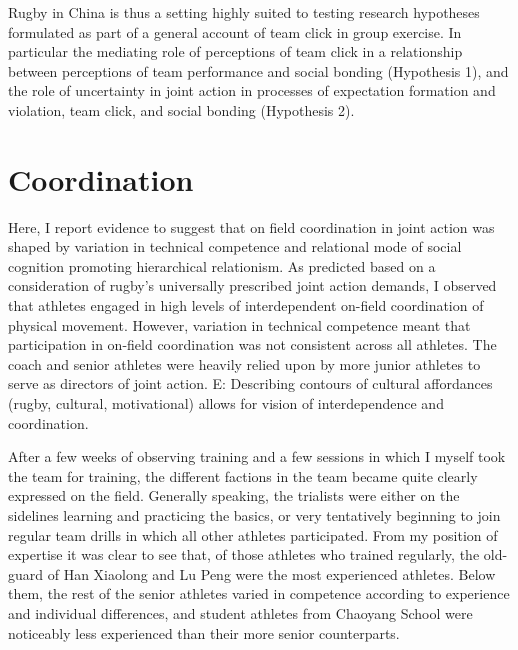 \begin{CJK}{UTF8}{gbsn}
Rugby in China is thus a setting highly suited to testing research hypotheses formulated as part of a general account of team click in group exercise. In particular the mediating role of perceptions of team click in a relationship between perceptions of team performance and social bonding (Hypothesis 1), and the role of uncertainty in joint action in processes of expectation formation and violation, team click, and social bonding (Hypothesis 2).



\section{Coordination}



Here, I report evidence to suggest that on field coordination in joint action was shaped by variation in technical competence and relational mode of social cognition promoting hierarchical relationism.  As predicted based on a consideration of rugby’s universally prescribed joint action demands, I observed that athletes engaged in high levels of interdependent on-field coordination of physical movement.  However, variation in technical competence meant that participation in on-field coordination was not consistent across all athletes.  The coach and senior athletes were heavily relied upon by more junior athletes to serve as directors of joint action.
E: Describing contours of cultural affordances (rugby, cultural, motivational) allows for vision of interdependence and coordination.

After a few weeks of observing training and a few sessions in which I myself took the team for training, the different factions in the team became quite clearly expressed on the field.  Generally speaking, the trialists were either on the sidelines learning and practicing the basics, or very tentatively beginning to join regular team drills in which all other athletes participated.  From my position of expertise it was clear to see that, of those athletes who trained regularly, the old-guard of Han Xiaolong and Lu Peng were the most experienced athletes.  Below them, the rest of the senior athletes varied in competence according to experience and individual differences, and student athletes from Chaoyang School were noticeably less experienced than their more senior counterparts.


\end{CJK}
